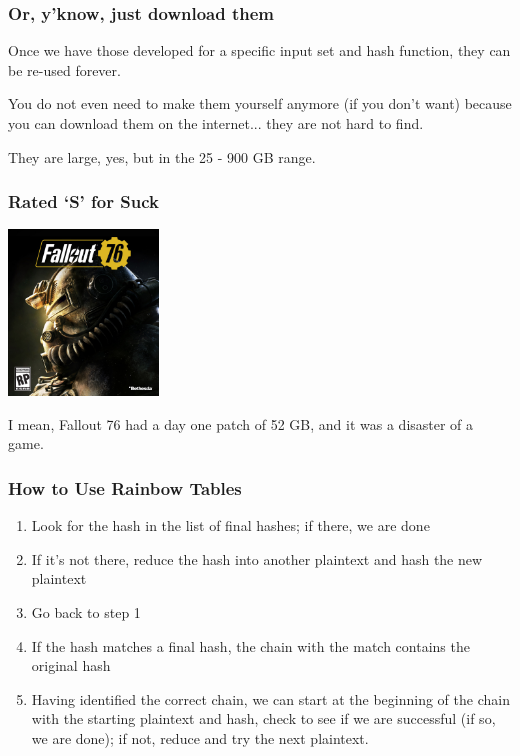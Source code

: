 \begin{frame}
\frametitle{Or, y'know, just download them}

Once we have those developed for a specific input set and hash function, they can be re-used forever. 

You do not even need to make them yourself anymore (if you don't want) because you can download them on the internet... they are not hard to find. 

They are large, yes, but in the 25 - 900 GB range. 


\end{frame}


\begin{frame}
\frametitle{Rated `S' for Suck}

\begin{center}
\includegraphics[width=0.3\textwidth]{images/Fallout_76_box_cover.jpg}
\end{center}

I mean, Fallout 76 had a day one patch of 52 GB, and it was a disaster of a game.

\end{frame}


\begin{frame}
\frametitle{How to Use Rainbow Tables}

\begin{enumerate}
	\item Look for the hash in the list of final hashes; if there, we are done
	\item If it's not there, reduce the hash into another plaintext and hash the new plaintext
	\item Go back to step 1
	\item If the hash matches a final hash, the chain with the match contains the original hash
	\item Having identified the correct chain, we can start at the beginning of the chain with the starting plaintext and hash, check to see if we are successful (if so, we are done); if not, reduce and try the next plaintext. 
\end{enumerate} 

\end{frame}


